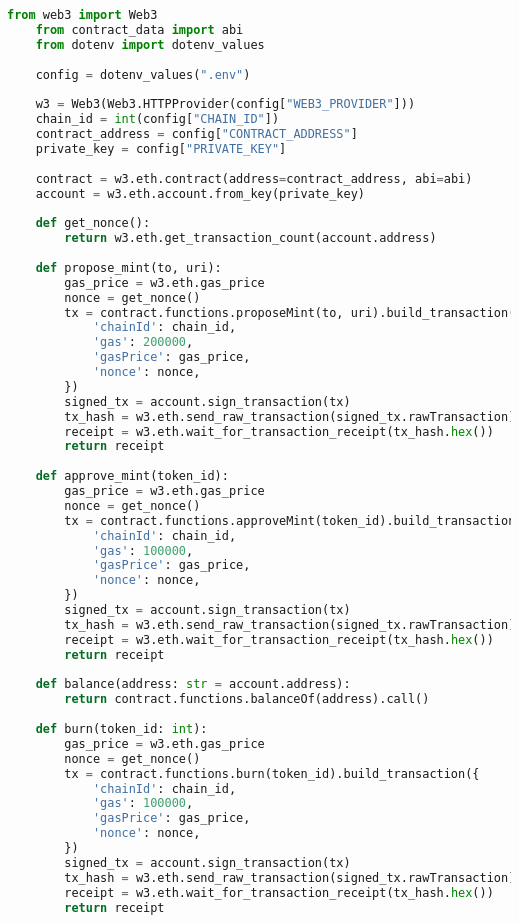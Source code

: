 \begin{lstlisting}[language=Python, caption=Функции выпуска дипломов]
    from web3 import Web3
    from contract_data import abi
    from dotenv import dotenv_values
    
    config = dotenv_values(".env")
    
    w3 = Web3(Web3.HTTPProvider(config["WEB3_PROVIDER"]))
    chain_id = int(config["CHAIN_ID"])
    contract_address = config["CONTRACT_ADDRESS"]
    private_key = config["PRIVATE_KEY"]
    
    contract = w3.eth.contract(address=contract_address, abi=abi)
    account = w3.eth.account.from_key(private_key)
    
    def get_nonce():
        return w3.eth.get_transaction_count(account.address)
    
    def propose_mint(to, uri):
        gas_price = w3.eth.gas_price
        nonce = get_nonce()
        tx = contract.functions.proposeMint(to, uri).build_transaction({
            'chainId': chain_id,
            'gas': 200000,
            'gasPrice': gas_price,
            'nonce': nonce,
        })
        signed_tx = account.sign_transaction(tx)
        tx_hash = w3.eth.send_raw_transaction(signed_tx.rawTransaction)
        receipt = w3.eth.wait_for_transaction_receipt(tx_hash.hex())
        return receipt
    
    def approve_mint(token_id):
        gas_price = w3.eth.gas_price
        nonce = get_nonce()
        tx = contract.functions.approveMint(token_id).build_transaction({
            'chainId': chain_id,
            'gas': 100000,
            'gasPrice': gas_price,
            'nonce': nonce,
        })
        signed_tx = account.sign_transaction(tx)
        tx_hash = w3.eth.send_raw_transaction(signed_tx.rawTransaction)
        receipt = w3.eth.wait_for_transaction_receipt(tx_hash.hex())
        return receipt
    
    def balance(address: str = account.address):
        return contract.functions.balanceOf(address).call()
    
    def burn(token_id: int):
        gas_price = w3.eth.gas_price
        nonce = get_nonce()
        tx = contract.functions.burn(token_id).build_transaction({
            'chainId': chain_id,
            'gas': 100000,
            'gasPrice': gas_price,
            'nonce': nonce,
        })
        signed_tx = account.sign_transaction(tx)
        tx_hash = w3.eth.send_raw_transaction(signed_tx.rawTransaction)
        receipt = w3.eth.wait_for_transaction_receipt(tx_hash.hex())
        return receipt
    

\end{lstlisting}
